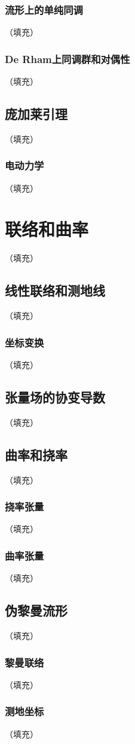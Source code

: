 \documentclass[hyperref,UTF8]{ctexbook}
\begin{document}
\subsection{流形上的单纯同调}（填充）
\subsection{De Rham上同调群和对偶性}（填充）
\section{庞加莱引理}（填充）
\subsection{电动力学}（填充）
\chapter{联络和曲率}（填充）
\section{线性联络和测地线}（填充）
\subsection{坐标变换}（填充）
\section{张量场的协变导数}（填充）
\section{曲率和挠率}（填充）
\subsection{挠率张量}（填充）
\subsection{曲率张量}（填充）
\section{伪黎曼流形}（填充）
\subsection{黎曼联络}（填充）
\subsection{测地坐标}（填充）
\end{document}
